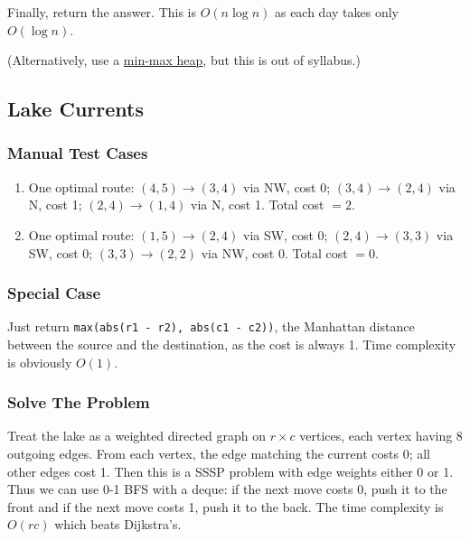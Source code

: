 \documentclass[12pt]{article}
\renewcommand{\t}{\texttt}
\begin{document}
Finally, return the answer. This is $O(n\log n)$ as each day takes only $O(\log n)$.

(Alternatively, use a \href{https://en.wikipedia.org/wiki/Min-max_heap}{min-max heap}, but this is out of syllabus.)
\subsection{Lake Currents}
\subsubsection{Manual Test Cases}
\begin{enumerate}
\item One optimal route:
$(4,5) \to (3,4)$ via NW, cost 0;
$(3,4) \to (2,4)$ via N, cost 1;
$(2,4) \to (1,4)$ via N, cost 1.
Total cost $=2$.
\item One optimal route:
$(1,5) \to (2,4)$ via SW, cost 0;
$(2,4) \to (3,3)$ via SW, cost 0;
$(3,3) \to (2,2)$ via NW, cost 0.
Total cost $=0$.
\end{enumerate}
\subsubsection{Special Case}
Just return \t{max(abs(r1 - r2), abs(c1 - c2))}, the Manhattan distance between the source and the destination, as the cost is always 1. Time complexity is obviously $O(1)$.
\subsubsection{Solve The Problem}
Treat the lake as a weighted directed graph on $r\times c$ vertices, each vertex having 8 outgoing edges. From each vertex, the edge matching the current costs 0; all other edges cost 1. Then this is a SSSP problem with edge weights either 0 or 1. Thus we can use 0-1 BFS with a deque: if the next move costs 0, push it to the front and if the next move costs 1, push it to the back. The time complexity is $O(rc)$ which beats Dijkstra's.
\newpage
\end{document}
